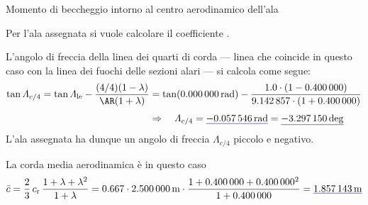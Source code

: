 \documentclass[[12pt,twoside]{book}
\begin{document}
\begin{myExampleX}{Momento di beccheggio intorno al centro aerodinamico dell'ala}{}
\smallskip
\noindent
{}

\smallskip
\noindent
{}

\smallskip
\noindent
{}

\smallskip
Per l'ala assegnata si vuole calcolare il coefficiente .

\medskip
L'angolo di freccia della linea dei quarti di corda --- linea che coincide in questo caso con la linea dei
fuochi delle sezioni alari --- si calcola come segue:
\[
\begin{split}
\tan
\Lambda_{c/4}
   = \tan\Lambda_\mathrm{le}-\dfrac{(4/4)(1-\lambda)}{\AR(1+\lambda)}
   & {}=
    \tan (\SI[round-precision=3]{\mySweepLEWingRAD}{\radian})
      - \dfrac{
         \num[round-precision=2]{1.0}
         \cdot (1-\SI[round-precision=2]{\myTaperRatioWing}{})
      }{
         \num[round-precision=2]{\myAspectRatioWing}
         \cdot (1+\SI[round-precision=2]{\myTaperRatioWing}{})} 
\\[3pt]
   & \Rightarrow
   \quad
   \Lambda_{c/4}
      = \mathunderline{mydarkblue}{ \SI[round-precision=4]{\mySweepQuarterChordWingRAD}{\radian} }
      = \mathunderline{mydarkblue}{ \SI[round-precision=1]{\mySweepQuarterChordWingDEG}{\deg} }
\end{split}
\]
L'ala assegnata ha dunque un angolo di freccia $\Lambda_{c/4}$ piccolo e negativo.

La corda media aerodinamica è in questo caso
\[
\bar{c} = \frac{2}{3} \, c_\mathrm{r} \, \frac{1+\lambda + \lambda^2}{1+\lambda}
  =
    \num{0.667} \cdot \SI[round-precision=2]{\myChordRootWingMT}{\metre}
      \cdot 
        \frac{
          1 + \SI[round-precision=2]{\myTaperRatioWing}{} + \SI[round-precision=2]{\myTaperRatioWing}{}^2
        }{
          1 + \SI[round-precision=2]{\myTaperRatioWing}{}
        }
    = \mathunderline{mydarkblue}{ \SI[round-precision=2]{\myMACWingMT}{\metre} }
\]


\end{myExampleX}
\end{document}
